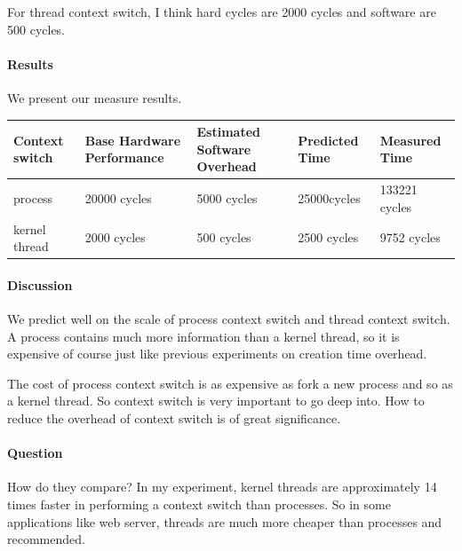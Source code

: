 For thread context switch, I think hard cycles are 2000 cycles and software are 500 cycles.

\paragraph{Results}
We present our measure results.

\begin{center}
\begin{tabular}{| p{3cm} | p{3cm} | p{3cm} | p{3cm} | p{3cm} |}
Context switch              & Base Hardware Performance  & Estimated Software Overhead  & Predicted Time  & Measured Time   \\
\hline
process & 20000 cycles& 5000 cycles& 25000cycles & 133221 cycles \\
kernel thread    & 2000 cycles& 500 cycles& 2500 cycles& 9752 cycles\\
\end{tabular}
\end{center}

\paragraph{Discussion}
We predict well on the scale of process context switch and thread context switch. A process contains much more information than a kernel thread, so it is expensive of course just like previous experiments on creation time overhead.

The cost of process context switch is as expensive as fork a new process and so as a kernel thread. So context switch is very important to go deep into. How to reduce the overhead of context switch is of great significance.

\paragraph{Question} How do they compare?
In my experiment, kernel threads are approximately 14 times faster in performing a context switch than processes. So in some applications like web server, threads are much more cheaper than processes and recommended.